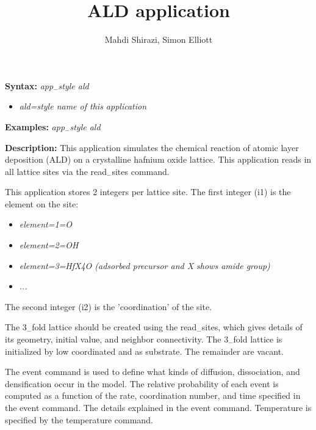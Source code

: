 \documentclass[a4paper,12pt]{report}
\title{ALD application}
\author{Mahdi Shirazi, Simon Elliott}
\begin{document}
\maketitle

\textbf{Syntax:}
\newline
  \emph{app$_-$style ald}

  \begin{itemize}

  \item \emph{ald=style name of this application}

  \end{itemize}

\textbf{Examples:}
\newline
  \emph{app$_-$style ald}
\newline

\textbf{Description:}
\newline
This application simulates the chemical reaction of atomic layer deposition (ALD) on a crystalline hafnium oxide lattice.
This application reads in all lattice sites via the read$_-$sites command.

This application stores 2 integers per lattice site. The first integer (i1) is the element on the site:

\begin{itemize}

  \item \emph{element=1=O}
  \item \emph{element=2=OH}
  \item \emph{element=3=HfX4O (adsorbed precursor and X shows amide group)}
  \item \emph{...}

\end{itemize}

The second integer (i2) is the 'coordination' of the site.

The 3$_-$fold lattice should be created using the read$_-$sites, which gives details of its geometry, initial value, and neighbor connectivity.
The 3$_-$fold lattice is initialized by low coordinated  and  as substrate.
The remainder are vacant.

The event command is used to define what kinds of diffusion, dissociation, and densification occur in the model.
The relative probability of each event is computed as a function of the rate, coordination number, and time specified in the event command.
The details explained in the event command.
Temperature is specified by the temperature command. 
\end{document}
